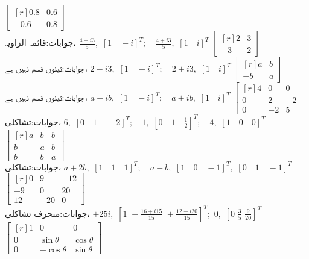\quad
$\begin{bmatrix*}[r] 0.8&0.6\\-0.6&0.8 \end{bmatrix*}$\\
جوابات:قائمہ الزاویہ،
$\tfrac{4-i3}{5}, \,\, [1\quad-i]^T; \quad \tfrac{4+i3}{5},\,\, [1\quad i]^T$
\quad
$\begin{bmatrix*}[r] 2&3\\-3&2 \end{bmatrix*}$\\
جوابات:تینوں قسم نہیں ہے، 
$2-i3,\,\, [1\quad -i]^T; \quad 2+i3,\,\,[1\quad i]^T$
\quad
$\begin{bmatrix*}[r] a&b\\-b&a \end{bmatrix*}$\\
جوابات:تینوں قسم نہیں ہے، 
$a-ib,\,\,[1\quad -i]^T;\quad a+ib,\,\,[1\quad i]^T$
\quad
$\begin{bmatrix*}[r] 4&0&0\\0&2&-2\\ 0&-2&5 \end{bmatrix*}$\\
جوابات:تشاکلی، 
$6,\,\,[0\quad 1\quad -2]^T;\quad 1,\,\,[0\quad 1\quad \tfrac{1}{2}]^T;\quad 4,\,\,[1\quad 0\quad 0]^T$
\quad
$\begin{bmatrix*}[r] a&b&b\\b&a&b\\b&b&a \end{bmatrix*}$\\
جوابات:تشاکلی، 
$a+2b,\,\,[1\quad 1\quad 1]^T;\quad a-b,\,\,[1\quad 0\quad-1]^T,\,\,[0\quad 1\quad -1]^T$
\quad
$\begin{bmatrix*}[r] 0&9&-12\\-9&0&20\\12&-20&0 \end{bmatrix*}$\\
جوابات:منحرف تشاکلی، 
$\pm 25i,\,\,[1\,\,\pm\tfrac{16+i15}{15}\,\, \pm\tfrac{12-i20}{15}]^T;\,\, 0,\,\,[0\,\, \tfrac{3}{5}\,\, \tfrac{9}{20}]^T$
\quad
$\begin{bmatrix*}[r] 1&0&0\\0&\sin \theta&\cos \theta\\ 0 &-\cos \theta&\sin \theta \end{bmatrix*}$\\
